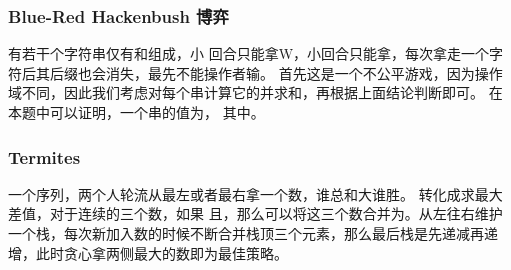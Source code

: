 \documentclass[8pt,a4paper]{article}
\newcommand{\txt}[1]{\par\noindent\footnotesize #1}
\newcommand{\inlineformula}[1]{\ensuremath{}}
\begin{document}
\begin{multicols}{2}
        \subsubsection{Blue-Red Hackenbush 博弈}
            \txt{有若干个字符串仅有\inlineformula{./assets/formulas_tex/formula_610.tex}和\inlineformula{./assets/formulas_tex/formula_611.tex}组成，小\inlineformula{./assets/formulas_tex/formula_612.tex} 回合只能拿W，小\inlineformula{./assets/formulas_tex/formula_613.tex}回合只能拿\inlineformula{./assets/formulas_tex/formula_614.tex}，每次拿走一个字符后其后缀也会消失，最先不能操作者输。
首先这是一个不公平游戏，因为操作域不同，因此我们考虑对每个串计算它的\inlineformula{./assets/formulas_tex/formula_615.tex}并求和，再根据上面结论判断即可。
在本题中可以证明，一个串的\inlineformula{./assets/formulas_tex/formula_616.tex}值为\inlineformula{./assets/formulas_tex/formula_617.tex}，
其中\inlineformula{./assets/formulas_tex/formula_618.tex}。}
        \subsubsection{Termites}
            \txt{一个序列，两个人轮流从最左或者最右拿一个数，谁总和大谁胜。
转化成求最大差值，对于连续的三个数\inlineformula{./assets/formulas_tex/formula_620.tex}，如果\inlineformula{./assets/formulas_tex/formula_621.tex} 且\inlineformula{./assets/formulas_tex/formula_622.tex}，那么可以将这三个数合并为\inlineformula{./assets/formulas_tex/formula_623.tex}。从左往右维护一个栈，每次新加入数的时候不断合并栈顶三个元素，那么最后栈是先递减再递增，此时贪心拿两侧最大的数即为最佳策略。}

\end{multicols}
\end{document}
